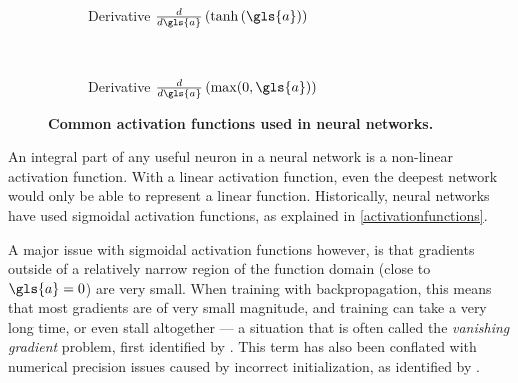 \documentclass[thesis]{subfiles}
\begin{document}
\begin{figure}[tbp]
\begin{subfigure}[t]{0.48\textwidth}
		\caption{Derivative $\frac{d}{d\gls{a}} \left(\tanh\left(\gls{a}\right)\right)$}\label{fig:tanhgradients}
	\end{subfigure}
	~
	\begin{subfigure}[t]{0.48\textwidth}
		\caption{Derivative $\frac{d}{d\gls{a}} \left(\max(0,\gls{a})\right)$}\label{fig:relugradient}
	\end{subfigure}
	\caption[Activation functions]{\textbf{Common activation functions used in neural networks.}}\label{fig:afunctions}
\end{figure}

An integral part of any useful neuron in a neural network is a non-linear activation function. With a linear activation function, even the deepest network would only be able to represent a linear function. Historically, neural networks have used sigmoidal activation functions, as explained in \cref{activationfunctions}.

A major issue with sigmoidal activation functions however, is that gradients outside of a relatively narrow region of the function domain (close to $\gls{a}=0$) are very small. When training with backpropagation, this means that most gradients are of very small magnitude, and training can take a very long time, or even stall altogether --- a situation that is often called the \emph{vanishing gradient} problem, first identified by \citet{hochreiter1991untersuchungen}. This term has also been conflated with numerical precision issues caused by incorrect initialization, as identified by \citet{glorot2010understanding}.
\end{document}
